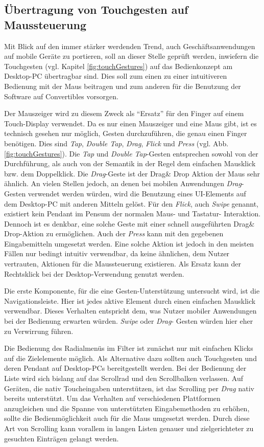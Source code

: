 \subsection{Übertragung von Touchgesten auf Maussteuerung} \label{sec:analyseGesten}
Mit Blick auf den immer stärker werdenden Trend, auch Geschäftsanwendungen auf mobile Geräte zu portieren, soll an dieser Stelle geprüft werden, inwiefern die Touchgesten (vgl. Kapitel \ref{fig:touchGestures}) auf das Bedienkonzept am Desktop-PC übertragbar sind. Dies soll zum einen zu einer intuitiveren Bedienung mit der Maus beitragen und zum anderen für die Benutzung der Software auf Convertibles vorsorgen.\par
Der Mauszeiger wird zu diesem Zweck als \enquote{Ersatz} für den Finger auf einem Touch-Display verwendet. Da es nur einen Mauszeiger und eine Maus gibt, ist es technisch gesehen nur möglich, Gesten durchzuführen, die genau einen Finger benötigen. Dies sind \textit{Tap}, \textit{Double Tap}, \textit{Drag}, \textit{Flick} und \textit{Press} (vgl. Abb. \ref{fig:touchGestures}). Die \textit{Tap} und \textit{Double Tap}-Gesten entsprechen sowohl von der Durchführung, als auch von der Semantik in der Regel dem einfachen Mausklick bzw. dem Doppelklick. Die \textit{Drag}-Geste ist der Drag\& Drop Aktion der Maus sehr ähnlich. An vielen Stellen jedoch, an denen bei mobilen Anwendungen \textit{Drag}-Gesten verwendet werden würden, wird die Benutzung eines UI-Elements auf dem Desktop-PC mit anderen Mitteln gelöst. Für den \textit{Flick}, auch \textit{Swipe} genannt, existiert kein Pendant im Pensum der normalen Maus- und Tastatur- Interaktion. Dennoch ist es denkbar, eine solche Geste mit einer schnell ausgeführten Drag\& Drop-Aktion zu ermöglichen. Auch der \textit{Press} kann mit den gegebenen Eingabemitteln umgesetzt werden. Eine solche Aktion ist jedoch in den meisten Fällen nur bedingt intuitiv verwendbar, da keine ähnlichen, dem Nutzer vertrauten, Aktionen für die Maussteuerung existieren. Als Ersatz kann der Rechtsklick bei der Desktop-Verwendung genutzt werden.\par
Die erste Komponente, für die eine Gesten-Unterstützung untersucht wird, ist die Navigationsleiste. Hier ist jedes aktive Element durch einen einfachen Mausklick verwendbar. Dieses Verhalten entspricht dem, was Nutzer mobiler Anwendungen bei der Bedienung erwarten würden. \textit{Swipe} oder \textit{Drag}- Gesten würden hier eher zu Verwirrung führen.\par
Die Bedienung des Radialmenüs im Filter ist zunächst nur mit einfachen Klicks auf die Zielelemente möglich. Als Alternative dazu sollten auch Touchgesten und deren Pendant auf Desktop-PCs bereitgestellt werden. Bei der Bedienung der Liste wird sich bislang auf das Scrollrad und den Scrollbalken verlassen. Auf Geräten, die nativ Toucheingaben unterstützen, ist das Scrolling per \textit{Drag} nativ bereits unterstützt. Um das Verhalten auf verschiedenen Plattformen anzugleichen und die Spanne von unterstützten Eingabemethoden zu erhöhen, sollte die Bedienmöglichkeit auch für die Maus umgesetzt werden. Durch diese Art von Scrolling kann vorallem in langen Listen genauer und zielgerichteter zu gesuchten Einträgen gelangt werden.\par %
